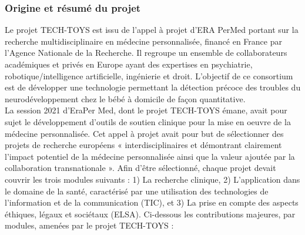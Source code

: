 \documentclass[5pt]{article}
\begin{document}
\subsubsection{Origine et résumé du projet}
\par Le projet TECH-TOYS est issu de l’appel à projet d’ERA PerMed portant sur la recherche multidisciplinaire
en médecine personnalisée, financé en France par l’Agence Nationale de la Recherche. Il regroupe un ensemble de collaborateurs académiques et privés en Europe ayant des expertises en psychiatrie, robotique/intelligence artificielle, ingénierie et droit. L’objectif de ce consortium est de développer une technologie permettant la détection précoce des troubles du neurodéveloppement chez le bébé à domicile de façon quantitative.\\
La session 2021 d’EraPer Med, dont le projet TECH-TOYS émane, avait pour sujet le développement
d’outils de soutien clinique pour la mise en oeuvre de la médecine personnalisée. Cet appel à projet avait
pour but de sélectionner des projets de recherche européens « interdisciplinaires et démontrant clairement l’impact potentiel de la médecine personnalisée ainsi que la valeur ajoutée par la collaboration transnationale »\cite{noauthor_joint_nodate}. Afin d’être sélectionné, chaque projet devait couvrir les trois modules suivants : 1) La recherche clinique, 2) L’application dans le domaine de la santé, caractérisé par une utilisation des technologies de l’information et de la communication (TIC), et 3) La prise en compte des aspects éthiques, légaux et sociétaux (ELSA). Ci-dessous les contributions majeures, par modules, amenées par le projet
TECH-TOYS :
\end{document}
